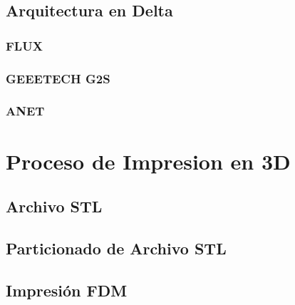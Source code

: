 \documentclass[]{article}
\begin{document}
\subsection{Arquitectura en Delta}

\subsubsection{FLUX}

\subsubsection{GEEETECH G2S}

\subsubsection{ANET}



\section{Proceso de Impresion en 3D}

\subsection{Archivo STL}

\subsection{Particionado de Archivo STL}

\subsection{Impresión FDM}








\end{document}
